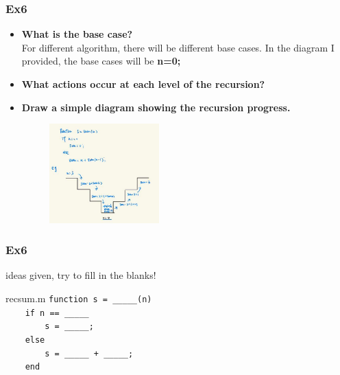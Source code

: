 \documentclass[
	11pt, %
]{beamer}
\begin{document}
\begin{frame}
	\frametitle{Ex6}
   \begin{itemize}
    \item \textbf{What is the base case?}
    \\ For different algorithm, there will be different base cases.
    In the diagram I provided, the base cases will be \textbf{n=0;}
    \item  \textbf{What actions occur at each level of the recursion?}
    \item \textbf{ Draw a simple diagram showing the recursion progress.}
    \begin{figure}
        \centering
        \includegraphics[width=0.4\textwidth]{ex6_recursion_diagram.jpg}
    \end{figure}
   \end{itemize}

\end{frame}


\begin{frame}
	\frametitle{Ex6}
   ideas given, try to fill in the blanks!
   \\

   \begin{block}{\quad \quad recsum.m}
    \texttt{function s = \_\_\_\_\_(n)} \\
    \texttt{\ \ \ \ if n == \_\_\_\_\_} \\
    \texttt{\ \ \ \ \ \ \ \ s = \_\_\_\_\_;} \\
    \texttt{\ \ \ \ else} \\
    \texttt{\ \ \ \ \ \ \ \ s = \_\_\_\_\_ + \_\_\_\_\_;} \\
    \texttt{\ \ \ \ end}
    
   \end{block}
\end{frame}
\end{document}
